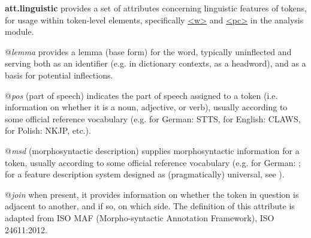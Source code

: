 \begin{sansreflist}
  
\item [\textbf{att.linguistic}] provides a set of attributes concerning linguistic features of tokens, for usage within token-level elements, specifically \hyperref[TEI.w]{<w>} and \hyperref[TEI.pc]{<pc>} in the analysis module.\hfil\\[-10pt]\begin{sansreflist}
    \item[@{\itshape lemma}]
  provides a lemma (base form) for the word, typically uninflected and serving both as an identifier (e.g. in dictionary contexts, as a headword), and as a basis for potential inflections.
    \item[@{\itshape pos}]
  (part of speech) indicates the part of speech assigned to a token (i.e. information on whether it is a noun, adjective, or verb), usually according to some official reference vocabulary (e.g. for German: STTS, for English: CLAWS, for Polish: NKJP, etc.).
    \item[@{\itshape msd}]
  (morphosyntactic description) supplies morphosyntactic information for a token, usually according to some official reference vocabulary (e.g. for German: ; for a feature description system designed as (pragmatically) universal, see ).
    \item[@{\itshape join}]
  when present, it provides information on whether the token in question is adjacent to another, and if so, on which side. The definition of this attribute is adapted from ISO MAF (Morpho-syntactic Annotation Framework), ISO 24611:2012.
\end{sansreflist}  
\end{sansreflist}
\par

